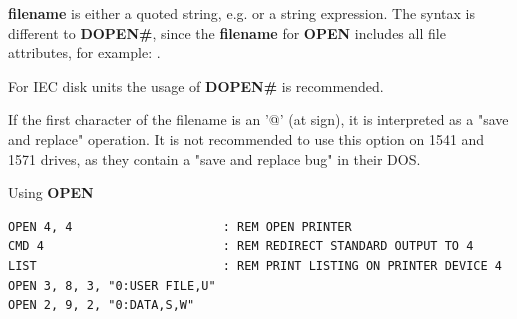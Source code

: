\begin{description}[leftmargin=2cm,style=nextline]
                  {\bf filename} is either a quoted string, e.g.  or a string expression. The syntax is different to {\bf DOPEN\#}, since the {\bf filename} for {\bf OPEN} includes all file attributes, for example: .

\item [Remarks:]  For IEC disk units the usage of {\bf DOPEN\#} is recommended.

                  If the first character of the filename is an '@' (at sign), it is interpreted as a "save and replace" operation. It is not recommended to use this option on 1541 and 1571 drives, as they contain a "save and replace bug" in their DOS.

\item [Example:]  Using {\bf OPEN}

\begin{tcolorbox}[colback=black,coltext=white]
\verbatimfont{\codefont}
\begin{verbatim}
OPEN 4, 4                     : REM OPEN PRINTER
CMD 4                         : REM REDIRECT STANDARD OUTPUT TO 4
LIST                          : REM PRINT LISTING ON PRINTER DEVICE 4
OPEN 3, 8, 3, "0:USER FILE,U"
OPEN 2, 9, 2, "0:DATA,S,W"
\end{verbatim}
\end{tcolorbox}
\end{description}


\newpage
